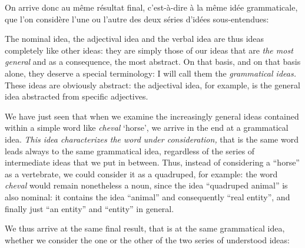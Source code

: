 \begin{sloppypar}
{  On arrive donc au même résultat final, c’est-à-dire à la même idée
  grammaticale, que l’on considère l’une ou l’autre des deux séries
  d’idées sous-entendues: } %
{The nominal idea, the adjectival idea and the verbal idea are thus
  ideas completely like other ideas: they are simply those of our
  ideas that are \emph{the most general} and as a consequence, the
  most abstract. On that basis, and on that basis alone, they deserve
  a special terminology: I will call them the \emph{grammatical
    ideas.} These ideas are obviously abstract: the adjectival idea,
  for example, is the general idea abstracted from specific
  adjectives.

  We have just seen that when we examine the increasingly general
  ideas contained within a simple word like \emph{cheval} `horse', we
  arrive in the end at a grammatical idea. \emph{This idea
    characterizes the word under consideration,} that is the same word
  leads always to the same grammatical idea, regardless of the series
  of intermediate ideas that we put in between. Thus, instead of
  considering a ``horse'' as a vertebrate, we could consider it as a
  quadruped, for example: the word \emph{cheval} would remain
  nonetheless a noun, since the idea ``quadruped animal'' is also
  nominal: it contains the idea ``animal'' and consequently ``real
  entity'', and finally just ``an entity'' and ``entity'' in general.

  We thus arrive at the same final result, that is at the same
  grammatical idea, whether we consider the one or the other of the
  two series of understood ideas: }

\end{sloppypar}
